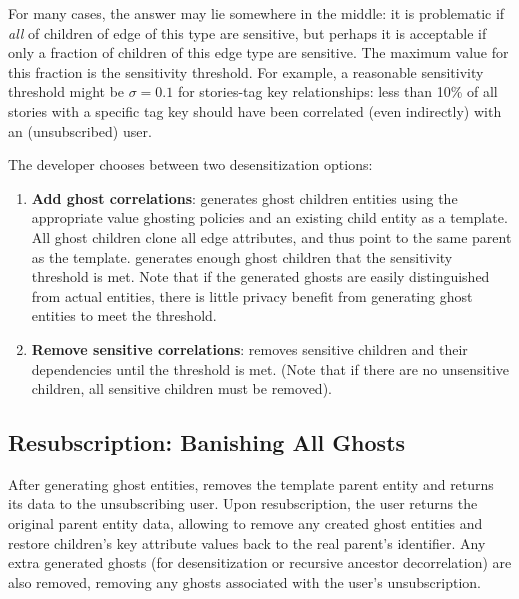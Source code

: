 For many cases, the answer may lie somewhere in the middle: it is problematic if \emph{all} of
children of edge of this type are sensitive, but perhaps it is acceptable if only a fraction of
children of this edge type are sensitive. The maximum value for this fraction is the sensitivity
threshold.  For example, a reasonable sensitivity threshold might be $\sigma = 0.1$ for stories-tag
key relationships: less than 10\% of all stories with a specific tag key should have been correlated
(even indirectly) with an (unsubscribed) user. 

The developer chooses between two desensitization options:
\begin{enumerate}
    \item \textbf{Add ghost correlations}: \sys generates ghost children entities using the
        appropriate value ghosting policies and an existing child entity as a template. All ghost
        children clone all edge attributes, and thus point to the same parent as the template. \sys
        generates enough ghost children that the sensitivity threshold is met.  Note that if the
        generated ghosts are easily distinguished from actual entities, there is little privacy
        benefit from generating ghost entities to meet the threshold.

\item \textbf{Remove sensitive correlations}: \sys removes sensitive children and their dependencies
    until the threshold is met. (Note that if there are no unsensitive children, all sensitive
        children must be removed).
\end{enumerate}

\subsection{Resubscription: Banishing All Ghosts}
After generating ghost entities, \sys removes the template parent entity and returns its data to the
unsubscribing user. Upon resubscription, the user returns the original parent entity data, allowing
\sys to remove any created ghost entities and restore children's key attribute values back to the
real parent's identifier.
Any extra generated ghosts (for desensitization or recursive ancestor decorrelation) are also
removed, removing any ghosts associated with the user's unsubscription.

        
